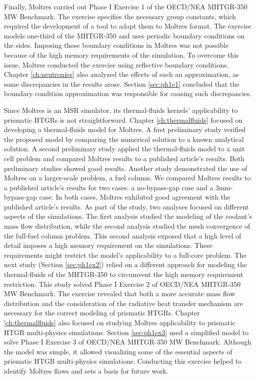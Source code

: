 Finally, Moltres carried out Phase I Exercise 1 of the OECD/NEA MHTGR-350 MW Benchmark.
The exercise specifies the necessary group constants, which required the development of a tool to adapt them to Moltres format.
The exercise models one-third of the MHTGR-350 and uses periodic boundary conditions on the sides.
Imposing those boundary conditions in Moltres was not possible because of the high memory requirements of the simulation.
To overcome this issue, Moltres conducted the exercise using reflective boundary conditions.
Chapter \ref{ch:neutronics} also analyzed the effects of such an approximation, as some discrepancies in the results arose.
Section \ref{sec:ph1e1} concluded that the boundary condition approximation was responsible for causing such discrepancies.

Since Moltres is an MSR simulator, its thermal-fluids kernels' applicability to prismatic HTGRs is not straightforward.
Chapter \ref{ch:thermalfluids} focused on developing a thermal-fluids model for Moltres.
A first preliminary study verified the proposed model by comparing the numerical solution to a known analytical solution.
A second preliminary study applied the thermal-fluids model to a unit cell problem and compared Moltres results to a published article's results.
Both preliminary studies showed good results.
Another study demonstrated the use of Moltres on a larger-scale problem, a fuel column.
We compared Moltres results to a published article's results for two cases: a no-bypass-gap case and a 3mm-bypass-gap case.
In both cases, Moltres exhibited good agreement with the published article's results.
As part of the study, two analyses focused on different aspects of the simulations.
The first analysis studied the modeling of the coolant's mass flow distribution, while the second analysis studied the mesh convergence of the full-fuel column problem.
This second analysis exposed that a high level of detail imposes a high memory requirement on the simulations.
These requirements might restrict the model's applicability to a full-core problem.
The next study (Section \ref{sec:ph1ex2}) relied on a different approach for modeling the thermal-fluids of the MHTGR-350 to circumvent the high memory requirement restriction.
This study solved Phase I Exercise 2 of OECD/NEA MHTGR-350 MW Benchmark.
The exercise revealed that both a more accurate mass flow distribution and the consideration of the radiative heat transfer mechanism are necessary for the correct modeling of prismatic HTGRs.
Chapter \ref{ch:thermalfluids} also focused on studying Moltres applicability to prismatic HTGR multi-physics simulations.
Section \ref{sec:ph1ex3} used a simplified model to solve Phase I Exercise 3 of OECD/NEA MHTGR-350 MW Benchmark.
Although the model was simple, it allowed visualizing some of the essential aspects of prismatic HTGR multi-physics simulations.
Conducting this exercise helped to identify Moltres flaws and sets a basis for future work.

